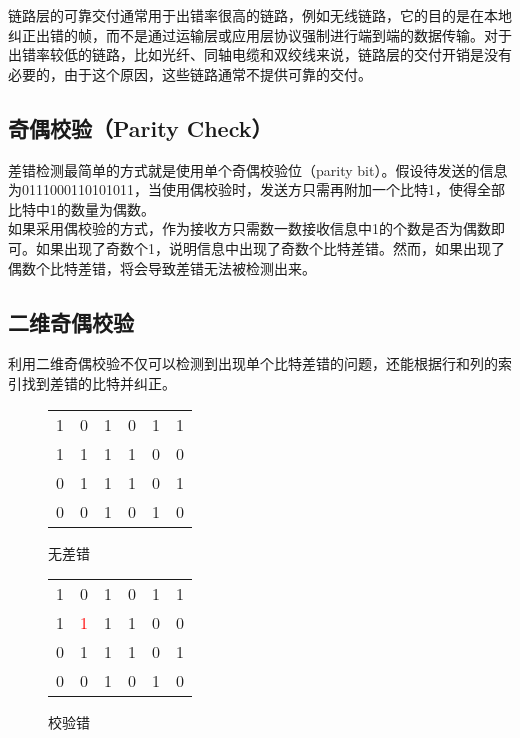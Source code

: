 链路层的可靠交付通常用于出错率很高的链路，例如无线链路，它的目的是在本地纠正出错的帧，而不是通过运输层或应用层协议强制进行端到端的数据传输。对于出错率较低的链路，比如光纤、同轴电缆和双绞线来说，链路层的交付开销是没有必要的，由于这个原因，这些链路通常不提供可靠的交付。\\

\subsection{奇偶校验（Parity Check）}

差错检测最简单的方式就是使用单个奇偶校验位（parity bit）。假设待发送的信息为0111000110101011，当使用偶校验时，发送方只需再附加一个比特1，使得全部比特中1的数量为偶数。\\

如果采用偶校验的方式，作为接收方只需数一数接收信息中1的个数是否为偶数即可。如果出现了奇数个1，说明信息中出现了奇数个比特差错。然而，如果出现了偶数个比特差错，将会导致差错无法被检测出来。\\

\subsection{二维奇偶校验}

利用二维奇偶校验不仅可以检测到出现单个比特差错的问题，还能根据行和列的索引找到差错的比特并纠正。\\

\begin{figure}[H]
    \centering
    \begin{tabular}{ccccc|c}
        1 & 0 & 1 & 0 & 1 & 1 \\
        1 & 1 & 1 & 1 & 0 & 0 \\
        0 & 1 & 1 & 1 & 0 & 1 \\
        \hline
        0 & 0 & 1 & 0 & 1 & 0
    \end{tabular}
    \caption{无差错}
\end{figure}

\vspace{0.5cm}

\begin{figure}[H]
    \centering
    \begin{tabular}{ccccc|c}
        1 & 0                  & 1 & 0 & 1 & 1 \\
        1 & \textcolor{red}{1} & 1 & 1 & 0 & 0 \\
        0 & 1                  & 1 & 1 & 0 & 1 \\
        \hline
        0 & 0                  & 1 & 0 & 1 & 0
    \end{tabular}
    \caption{校验错}
\end{figure}

